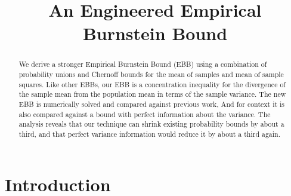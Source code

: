 \documentclass[aap,preprint]{imsart}
\begin{document}
\begin{frontmatter}

\title{An Engineered Empirical Burnstein Bound}

\begin{aug}
\author{ \corref{}
}
\address{Mark Alexander Burgess\\College of Engineering \& Computer Science\\Australian National University\\Canberra, ACT, Australia, 2600\\\\
}
\end{aug}


\begin{abstract}
We derive a stronger Empirical Burnstein Bound (EBB) using a combination of probability unions and Chernoff bounds for the mean of samples and mean of sample squares.
Like other EBBs, our EBB is a concentration inequality for the divergence of the sample mean from the population mean in terms of the sample variance.
The new EBB is numerically solved and compared against previous work, And for context it is also compared against a bound with perfect information about the variance.
The analysis reveals that our technique can shrink existing probability bounds by about a third, and that perfect variance information would reduce it by about a third again.
\end{abstract}

\begin{keyword}[class=MSC]
\kwd[60E15]{}
\kwd[; 62H10]{}
\end{keyword}

\begin{keyword}
\end{keyword}

\end{frontmatter}






\section{Introduction}
\end{document}
